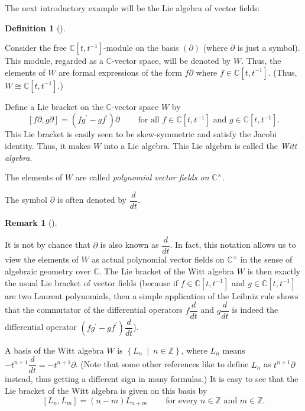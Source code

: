 \documentclass
[numbers=enddot,12pt,final,onecolumn,german,notitlepage]{scrartcl}%
\theoremstyle{definition}
\newtheorem{defi}[theo]{Definition}
\newenvironment{definition}[1][]
{\begin{defi}[#1]\begin{leftbar}}
{\end{leftbar}\end{defi}}
\newtheorem{remk}[theo]{Remark}
\newenvironment{remark}[1][]
{\begin{remk}[#1]\begin{leftbar}}
{\end{leftbar}\end{remk}}
\begin{document}
The next introductory example will be the Lie algebra of vector fields:

\begin{definition}
Consider the free $\mathbb{C}\left[  t,t^{-1}\right]  $-module on the basis
$\left(  \partial\right)  $ (where $\partial$ is just a symbol). This module,
regarded as a $\mathbb{C}$-vector space, will be denoted by $W$. Thus, the
elements of $W$ are formal expressions of the form $f\partial$ where
$f\in\mathbb{C}\left[  t,t^{-1}\right]  $. (Thus, $W\cong\mathbb{C}\left[
t,t^{-1}\right]  $.)

Define a Lie bracket on the $\mathbb{C}$-vector space $W$ by%
\[
\left[  f\partial,g\partial\right]  =\left(  fg^{\prime}-gf^{\prime}\right)
\partial\ \ \ \ \ \ \ \ \ \ \text{for all }f\in\mathbb{C}\left[
t,t^{-1}\right]  \text{ and }g\in\mathbb{C}\left[  t,t^{-1}\right]  .
\]
This Lie bracket is easily seen to be skew-symmetric and satisfy the Jacobi
identity. Thus, it makes $W$ into a Lie algebra. This Lie algebra is called
the \textit{Witt algebra}.

The elements of $W$ are called \textit{polynomial vector fields on
}$\mathbb{C}^{\times}$.

The symbol $\partial$ is often denoted by $\dfrac{d}{dt}$.
\end{definition}

\begin{remark}
It is not by chance that $\partial$ is also known as $\dfrac{d}{dt}$. In fact,
this notation allows us to view the elements of $W$ as actual polynomial
vector fields on $\mathbb{C}^{\times}$ in the sense of algebraic geometry over
$\mathbb{C}$. The Lie bracket of the Witt algebra $W$ is then exactly the
usual Lie bracket of vector fields (because if $f\in\mathbb{C}\left[
t,t^{-1}\right]  $ and $g\in\mathbb{C}\left[  t,t^{-1}\right]  $ are two
Laurent polynomials, then a simple application of the Leibniz rule shows that
the commutator of the differential operators $f\dfrac{d}{dt}$ and $g\dfrac
{d}{dt}$ is indeed the differential operator $\left(  fg^{\prime}-gf^{\prime
}\right)  \dfrac{d}{dt}$).
\end{remark}

A basis of the Witt algebra $W$ is $\left\{  L_{n}\ \mid\ n\in\mathbb{Z}%
\right\}  $, where $L_{n}$ means $-t^{n+1}\dfrac{d}{dt}=-t^{n+1}\partial$.
(Note that some other references like to define $L_{n}$ as $t^{n+1}\partial$
instead, thus getting a different sign in many formulas.) It is easy to see
that the Lie bracket of the Witt algebra is given on this basis by
\[
\left[  L_{n},L_{m}\right]  =\left(  n-m\right)  L_{n+m}%
\ \ \ \ \ \ \ \ \ \ \text{for every }n\in\mathbb{Z}\text{ and }m\in
\mathbb{Z}.
\]
\end{document}
